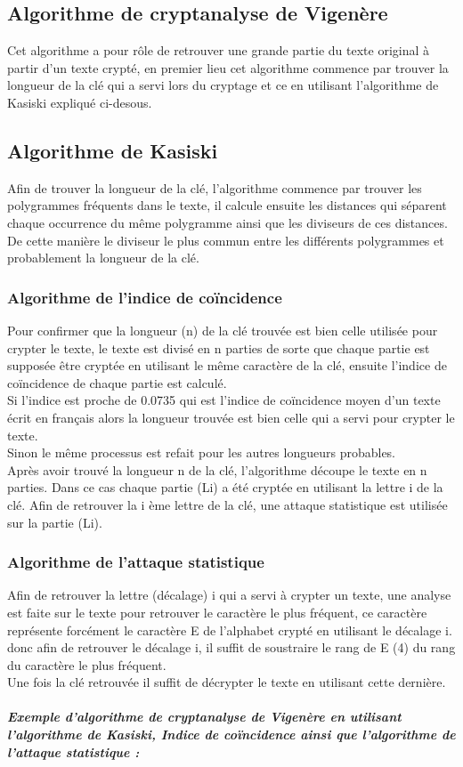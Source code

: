 \documentclass[11pt]{article}
\begin{document}
 \subsection{Algorithme de cryptanalyse de Vigenère }
 Cet algorithme a pour rôle de retrouver une grande partie du texte original à partir d'un texte crypté, en premier lieu cet algorithme commence par trouver la longueur de la clé qui a servi lors du cryptage et ce en utilisant l'algorithme de Kasiski expliqué ci-desous.
 
 \subsection{Algorithme de Kasiski}
 Afin de trouver la longueur de la clé, l'algorithme commence par trouver les polygrammes fréquents dans le texte, il calcule ensuite les distances qui séparent chaque occurrence du même polygramme ainsi que les diviseurs de ces distances.
De cette manière le diviseur le plus commun entre les différents polygrammes et probablement la longueur de la clé.

\subsubsection{Algorithme de l’indice de coïncidence}
 Pour confirmer que la longueur (n) de la clé trouvée est bien celle utilisée pour crypter le texte, le texte est divisé en n parties de sorte que chaque partie est supposée être cryptée en utilisant le même caractère de la clé, ensuite l'indice de coïncidence de chaque partie est calculé.\\
Si l'indice est proche de 0.0735 qui est l'indice de coïncidence moyen d'un texte écrit en français alors la longueur trouvée est bien celle qui a servi pour crypter le texte.\\ Sinon le même processus est refait pour les autres longueurs probables. \\
Après avoir trouvé la longueur n de la clé, l'algorithme découpe le texte en n parties. Dans ce cas chaque partie (Li) a été cryptée en utilisant la lettre i de la clé.
Afin de retrouver la i ème lettre de la clé, une attaque statistique est utilisée sur la partie (Li).

\subsubsection{Algorithme de l’attaque statistique}
Afin de retrouver la lettre (décalage) i qui a servi à crypter un texte, une analyse est faite sur le texte pour retrouver le caractère le plus fréquent, ce caractère représente forcément le caractère E de l’alphabet crypté en utilisant le décalage i.
donc afin de retrouver le décalage i, il suffit de soustraire le rang de E (4) du rang du caractère le plus fréquent.\\
Une fois la clé retrouvée il suffit de décrypter le texte en utilisant cette dernière.
\subparagraph{Exemple d'algorithme de cryptanalyse de Vigenère en utilisant l’algorithme de Kasiski, Indice de coïncidence ainsi que l’algorithme de l’attaque statistique : } \ \ \ \ \ \ \ \ \ \ \ \ \ \ \ \ \ \ \ \ \ \ \ \ \ \ \ \ \ \ \ \ \ \ \ \ \ \ \ \ \ \ \ \ \ \ \ \ 
\end{document}
